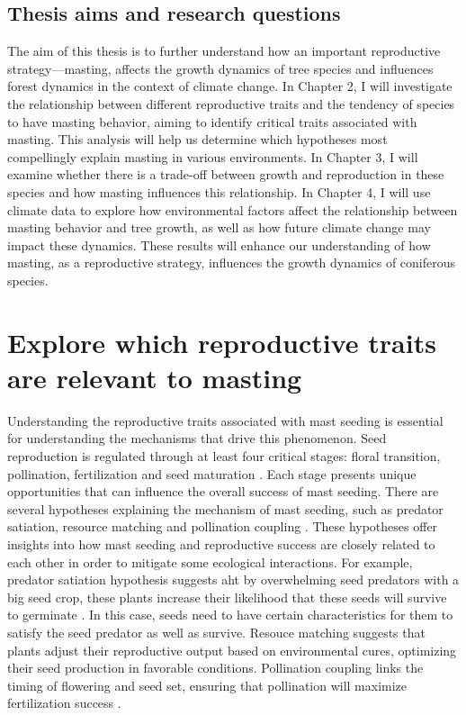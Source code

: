 \documentclass[11pt,letter]{article}
\begin{document}
\subsection{Thesis aims and research questions}
The aim of this thesis is to further understand how an important reproductive strategy—masting, affects the growth dynamics of tree species and influences forest dynamics in the context of climate change. In Chapter 2, I will investigate the relationship between different reproductive traits and the tendency of species to have masting behavior, aiming to identify critical traits associated with masting. This analysis will help us determine which hypotheses most compellingly explain masting in various environments. In Chapter 3, I will examine whether there is a trade-off between growth and reproduction in these species and how masting influences this relationship. In Chapter 4, I will use climate data to explore how environmental factors affect the relationship between masting behavior and tree growth, as well as how future climate change may impact these dynamics. These results will enhance our understanding of how masting, as a reproductive strategy, influences the growth dynamics of coniferous species.


\section{Explore which reproductive traits are relevant to masting}
Understanding the reproductive traits associated with mast seeding is essential for understanding the mechanisms that drive this phenomenon. Seed reproduction is regulated through at least four critical stages: floral transition, pollination, fertilization and seed maturation \citep{satake2021studying}. Each stage presents unique opportunities that can influence the overall success of mast seeding. There are several hypotheses explaining the mechanism of mast seeding, such as predator satiation, resource matching and pollination coupling \citep{kelly1994evolutionary, kelly2002mast, crone2014resource}. These hypotheses offer insights into how mast seeding and reproductive success are closely related to each other in order to mitigate some ecological interactions. For example, predator satiation hypothesis suggests aht by overwhelming seed predators with a big seed crop, these plants increase their likelihood that these seeds will survive to germinate \citep{janzen1971seed, silvertown1980evolutionary}. In this case, seeds need to have certain characteristics for them to satisfy the seed predator as well as survive. Resouce matching suggests that plants adjust their reproductive output based on environmental cures, optimizing their seed production in favorable conditions. Pollination coupling links the timing of flowering and seed set, ensuring that pollination will maximize fertilization success \citep{bogdziewicz2017masting, bogdziewicz2020flowering}. 
\end{document}
